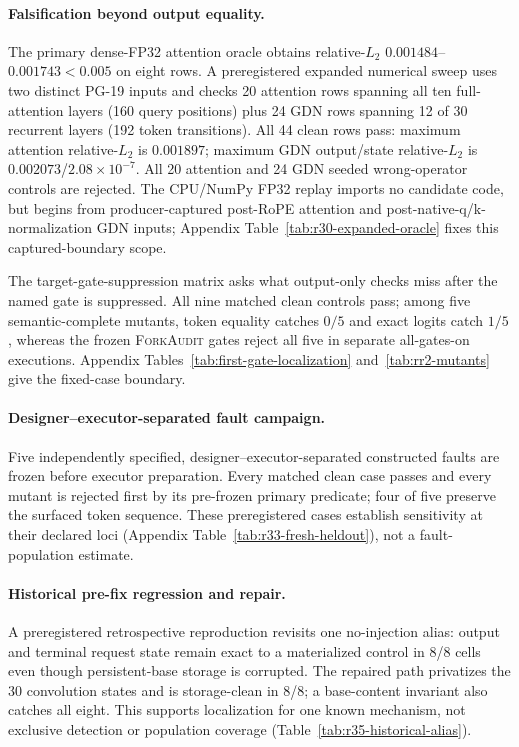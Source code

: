 \documentclass{article}
\newcommand{\method}{\textsc{ForkAudit}}
\begin{document}
\paragraph{Falsification beyond output equality.}

The primary dense-FP32 attention oracle obtains relative-$L_2$
$0.001484$--$0.001743<0.005$ on eight rows.  A preregistered expanded numerical sweep uses
two distinct PG-19 inputs and checks 20 attention rows spanning all ten
full-attention layers (160 query positions) plus 24 GDN rows spanning 12 of 30
recurrent layers (192 token transitions).  All 44 clean rows pass:
maximum attention relative-$L_2$ is $0.001897$; maximum GDN output/state
relative-$L_2$ is $0.002073$/$2.08\times10^{-7}$.  All 20 attention and 24 GDN
seeded wrong-operator controls are rejected.  The CPU/NumPy FP32 replay imports
no candidate code, but begins from producer-captured post-RoPE attention and
post-native-q/k-normalization GDN inputs; Appendix
Table~\ref{tab:r30-expanded-oracle} fixes this captured-boundary scope.

The target-gate-suppression matrix asks what output-only checks miss after the
named gate is suppressed.  All nine matched clean controls pass; among five
semantic-complete mutants, token equality catches $0/5$ and exact logits catch
$1/5$, whereas the frozen \method{} gates reject all five in separate
all-gates-on executions.  Appendix Tables~\ref{tab:first-gate-localization}
and~\ref{tab:rr2-mutants} give the fixed-case boundary.

\paragraph{Designer--executor-separated fault campaign.}
Five independently specified, designer--executor-separated constructed faults
are frozen before executor preparation.  Every matched clean case passes and
every mutant is rejected first by its pre-frozen primary predicate; four of
five preserve the surfaced token sequence.  These preregistered cases establish
sensitivity at their declared loci (Appendix
Table~\ref{tab:r33-fresh-heldout}), not a fault-population estimate.

\paragraph{Historical pre-fix regression and repair.}
A preregistered retrospective reproduction revisits one no-injection alias:
output and terminal request state remain exact to a materialized control in
8/8 cells even though persistent-base storage is corrupted.  The repaired path
privatizes the 30 convolution states and is storage-clean in 8/8; a base-content
invariant also catches all eight.  This supports localization for one known
mechanism, not exclusive detection or population coverage
(Table~\ref{tab:r35-historical-alias}).
\end{document}
